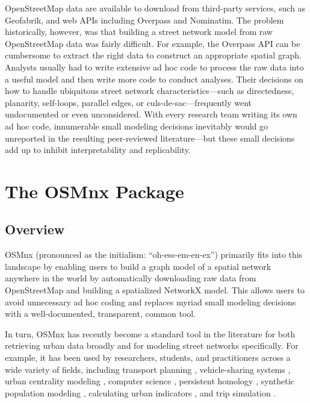 \documentclass[12pt,letterpaper]{article} %
\begin{document}
OpenStreetMap data are available to download from third-party services, such as Geofabrik, and web APIs including Overpass and Nominatim. The problem historically, however, was that building a street network model from raw OpenStreetMap data was fairly difficult. For example, the Overpass API can be cumbersome to extract the right data to construct an appropriate spatial graph. Analysts usually had to write extensive ad hoc code to process the raw data into a useful model and then write more code to conduct analyses. Their decisions on how to handle ubiquitous street network characteristics---such as directedness, planarity, self-loops, parallel edges, or culs-de-sac---frequently went undocumented or even unconsidered. With every research team writing its own ad hoc code, innumerable small modeling decisions inevitably would go unreported in the resulting peer-reviewed literature---but these small decisions add up to inhibit interpretability and replicability.

\section{The OSMnx Package}

\subsection{Overview}

OSMnx (pronounced as the initialism: \enquote{oh-ess-em-en-ex}) primarily fits into this landscape by enabling users to build a graph model of a spatial network anywhere in the world by automatically downloading raw data from OpenStreetMap and building a spatialized NetworkX model. This allows users to avoid unnecessary ad hoc coding and replaces myriad small modeling decisions with a well-documented, transparent, common tool.

In turn, OSMnx has recently become a standard tool in the literature for both retrieving urban data broadly and for modeling street networks specifically. For example, it has been used by researchers, students, and practitioners across a wide variety of fields, including transport planning \citep[e.g.,][]{natera_orozco_data-driven_2020,dumedah_case_2020}, vehicle-sharing systems \citep[e.g.,][]{luo_d3p_2020,zhang_electric_2019}, urban centrality modeling \citep[e.g.,][]{wang_road_2020,torres_alisis_2019}, computer science \citep[e.g.,][]{yin_multi-task_2020,young_automatic_2020}, persistent homology \citep[e.g.,][]{feng_spatial_2020,abdelkader_topological_2018}, synthetic population modeling \citep[e.g.,][]{tuccillo_likeness_2022,tuccillo_spatial_2023}, calculating urban indicators \citep[e.g.,][]{quistberg_building_2019,wang_impacts_2020}, and trip simulation \citep[e.g.,][]{hernandez-hernandez_anger_2019,merchan_quantifying_2020}.
\end{document}

